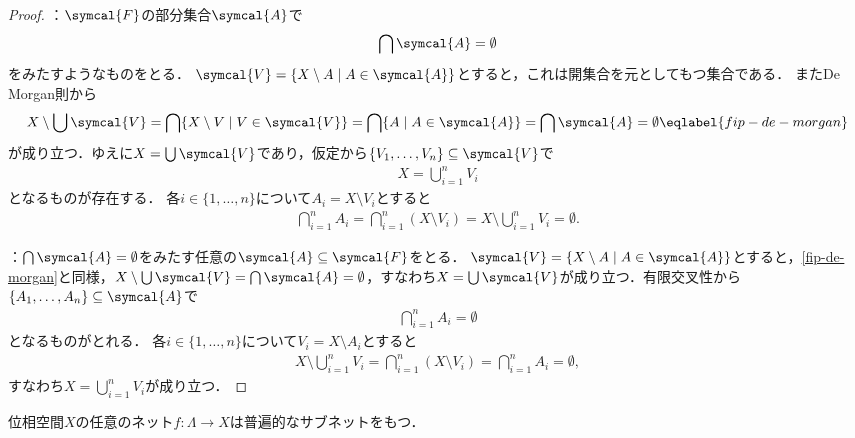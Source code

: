 \documentclass{ltjsbook}
\begin{document}
\begin{proof} ：\(\symcal{F}\)の部分集合\(\symcal{A}\)で
\begin{align*}
    \bigcap \symcal{A} = \emptyset
\end{align*}
をみたすようなものをとる．
\(\symcal{V} = \{ X \setminus A \mid A \in \symcal{A}\}\)とすると，これは開集合を元としてもつ集合である．
またDe Morgan則から
\begin{align}
    X \setminus \bigcup \symcal{V}
    = \bigcap \{X \setminus V \mid V \in \symcal{V}\}
    = \bigcap \{A \mid A \in \symcal{A}\}
    = \bigcap \symcal{A}
    = \emptyset \eqlabel{fip-de-morgan}
\end{align}
が成り立つ．ゆえに\(X = \bigcup \symcal{V}\)であり，仮定から\(\{V_1, \ldots, V_n\} \subseteq \symcal{V}\)で
\begin{align*}
    X = \bigcup_{i = 1}^n V_i
\end{align*}
となるものが存在する．
各\(i \in \{1, \ldots, n\}\)について\(A_i = X \setminus V_i\)とすると
\begin{align*}
    \bigcap_{i = 1}^n A_i
    = \bigcap_{i = 1}^n (X \setminus V_i)
    = X \setminus \bigcup_{i = 1}^n V_i
    = \emptyset.
\end{align*}

：\(\bigcap \symcal{A} = \emptyset\)をみたす任意の\(\symcal{A} \subseteq \symcal{F}\)をとる．
\(\symcal{V} = \{X \setminus A \mid A \in \symcal{A}\}\)とすると，\eqref{fip-de-morgan}と同様，\(X \setminus \bigcup \symcal{V} = \bigcap \symcal{A} = \emptyset\)，すなわち\(X = \bigcup \symcal{V}\)が成り立つ．有限交叉性から\(\{A_1, \ldots, A_n\} \subseteq \symcal{A}\)で
\begin{align*}
    \bigcap_{i = 1}^n A_i = \emptyset
\end{align*}
となるものがとれる．
各\(i \in \{1, \ldots, n\}\)について\(V_i = X \setminus A_i\)とすると
\begin{align*}
    X \setminus \bigcup_{i = 1}^n V_i
    = \bigcap_{i = 1}^n (X \setminus V_i)
    = \bigcap_{i = 1}^n A_i
    = \emptyset, %
\end{align*}
すなわち\(X = \bigcup_{i = 1}^n V_i\)が成り立つ．
\end{proof}

\begin{thmbox}
\begin{theorem}
位相空間\(X\)の任意のネット\(f \colon \Lambda \to X\)は普遍的なサブネットをもつ．
\end{theorem}
\end{thmbox}
\end{document}
